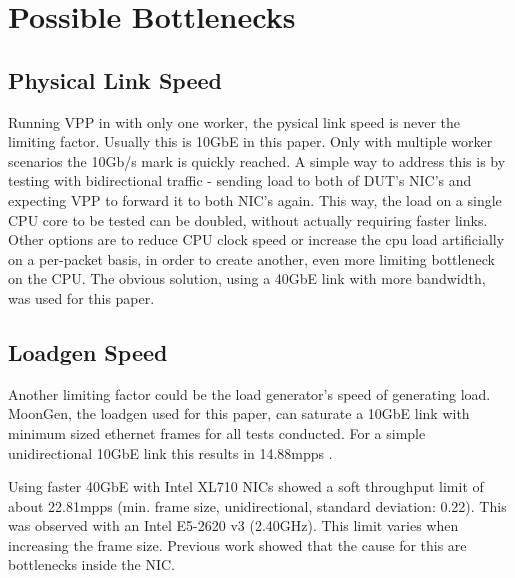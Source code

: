 \section{Possible Bottlenecks}

\subsection{Physical Link Speed}
\label{sec:linkspeed}


Running VPP in with only one worker, the pysical link speed is never
the limiting factor. Usually this is 10GbE in this paper. Only with
multiple worker scenarios the 10Gb/s mark is quickly reached. A simple
way to address this is by testing with bidirectional traffic - sending
load to both of DUT's NIC's and expecting VPP to forward it to both
NIC's again. This way, the load on a single CPU core to be tested can
be doubled, without actually requiring faster links. Other options are
to reduce CPU clock speed or increase the cpu load artificially on a
per-packet basis, in order to create another, even more limiting
bottleneck on the CPU. The obvious solution, using a 40GbE link with
more bandwidth, was used for this paper.


\subsection{Loadgen Speed}


Another limiting factor could be the load generator's speed of
generating load. MoonGen, the loadgen used for this paper, can
saturate a 10GbE link with minimum sized ethernet frames for all tests
conducted. For a simple unidirectional 10GbE link this results in
14.88mpps \cite{emmerich2015assessing}.


\label{sec:40gbelimit}

Using faster 40GbE with Intel XL710 NICs showed a soft throughput
limit of about 22.81mpps (min. frame size, unidirectional, standard
deviation: 0.22). This was observed with an Intel E5-2620 v3
(2.40GHz). This limit varies when increasing the frame size. Previous
work showed that the cause for this are bottlenecks inside the NIC.
\cite{emmerich2015moongen}

